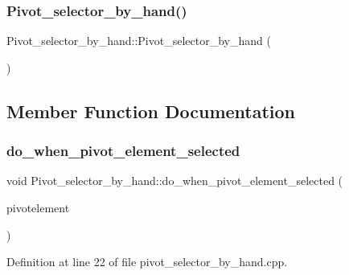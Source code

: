 \subsubsection{\texorpdfstring{Pivot\+\_\+selector\+\_\+by\+\_\+hand()}{Pivot\_selector\_by\_hand()}}
{\footnotesize\ttfamily Pivot\+\_\+selector\+\_\+by\+\_\+hand\+::\+Pivot\+\_\+selector\+\_\+by\+\_\+hand (\begin{DoxyParamCaption}{ }\end{DoxyParamCaption})\hspace{0.3cm}{\ttfamily [default]}}



\subsection{Member Function Documentation}
\mbox{\label{classPivot__selector__by__hand_a2ee01f0ccc6ad957a46e4d6ecd891645}} 
\subsubsection{\texorpdfstring{do\+\_\+when\+\_\+pivot\+\_\+element\+\_\+selected}{do\_when\_pivot\_element\_selected}}
{\footnotesize\ttfamily void Pivot\+\_\+selector\+\_\+by\+\_\+hand\+::do\+\_\+when\+\_\+pivot\+\_\+element\+\_\+selected (\begin{DoxyParamCaption}\item[{Q\+Model\+Index}]{pivotelement }\end{DoxyParamCaption})\hspace{0.3cm}{\ttfamily [slot]}}



Definition at line 22 of file pivot\+\_\+selector\+\_\+by\+\_\+hand.\+cpp.

